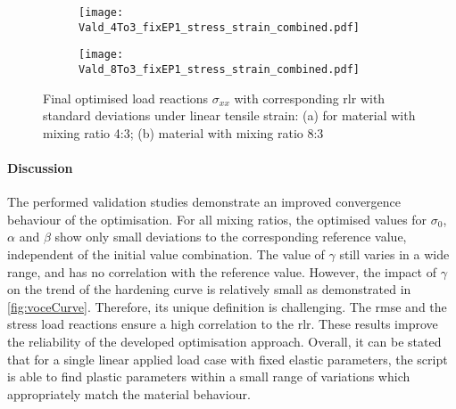 \begin{figure}[H]
\centering

\begin{subfigure}[t]{0.495\textwidth}
    \centering
    \texttt{[image: Vald\_4To3\_fixEP1\_stress\_strain\_combined.pdf]}
    \caption{}
    \label{fig:validStressStrain4to3}
\end{subfigure}
\hfill
\begin{subfigure}[t]{0.495\textwidth}
    \centering
    \texttt{[image: Vald\_8To3\_fixEP1\_stress\_strain\_combined.pdf]}
    \caption{}
    \label{fig:validStressStrain8to3}
\end{subfigure}
\caption{Final optimised load reactions $\sigma_{xx}$ with corresponding \acrfull{rlr} with standard deviations under linear tensile strain: (a) for material with mixing ratio 4:3; (b) material with mixing ratio 8:3}
\label{fig:validStressStrain4and8}
\end{figure}


\paragraph{Discussion}
The performed validation studies demonstrate an improved convergence behaviour of the optimisation. For all mixing ratios, the optimised values for $\sigma_0$, $\alpha$ and $\beta$ show only small deviations to the corresponding  reference value, independent of the initial value combination. The value of $\gamma$ still varies in a wide range, and has no correlation with the reference value. However, the impact of $\gamma$ on the trend of the hardening curve is relatively small as demonstrated in \autoref{fig:voceCurve}. Therefore, its unique definition is challenging. The \acrshort{rmse} and the stress load reactions ensure a high correlation to the \acrlong{rlr}. These results improve the reliability of the developed optimisation approach. Overall, it can be stated that for a single linear applied load case with fixed elastic parameters, the script is able to find plastic parameters within a small range of variations which appropriately match the material behaviour.



